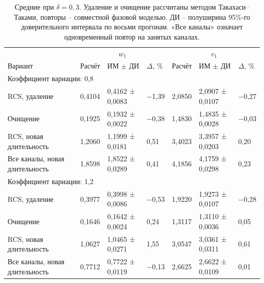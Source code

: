 
\begin{table}[!htbp]
\centering\small\setlength{\tabcolsep}{2pt}
\begin{tabular}{@{}p{4.16cm}p{1.61cm}p{2.83cm}p{1.28cm}p{1.61cm}p{2.83cm}p{1.28cm}@{}}
\toprule
 & \multicolumn{3}{c}{$w_1$} & \multicolumn{3}{c}{$v_1$} \\
Вариант & Расчёт & ИМ $\pm$ ДИ & $\Delta$, \% & Расчёт & ИМ $\pm$ ДИ & $\Delta$, \% \\
\midrule
\multicolumn{7}{l}{Коэффициент вариации: 0,8} \\
RCS, удаление & 0,4104 & 0,4162 ± 0,0083 & −1,39 & 2,0850 & 2,0907 ± 0,0107 & −0,27 \\
Очищение & 0,1925 & 0,1932 ± 0,0022 & −0,38 & 1,4830 & 1,4835 ± 0,0028 & −0,03 \\
RCS, новая длительность & 1,2060 & 1,1999 ± 0,0181 & 0,51 & 3,4023 & 3,3957 ± 0,0203 & 0,20 \\
Все каналы, новая длительность & 1,8598 & 1,8522 ± 0,0289 & 0,41 & 4,1856 & 4,1759 ± 0,0298 & 0,23 \\
\multicolumn{7}{l}{Коэффициент вариации: 1,2} \\
RCS, удаление & 0,3977 & 0,3998 ± 0,0086 & −0,53 & 1,9220 & 1,9273 ± 0,0107 & −0,28 \\
Очищение & 0,1646 & 0,1642 ± 0,0024 & 0,24 & 1,3117 & 1,3110 ± 0,0036 & 0,05 \\
RCS, новая длительность & 1,0627 & 1,0465 ± 0,0271 & 1,55 & 3,0547 & 3,0361 ± 0,0311 & 0,61 \\
Все каналы, новая длительность & 0,7712 & 0,7722 ± 0,0119 & −0,13 & 2,6625 & 2,6622 ± 0,0109 & 0,01 \\
\bottomrule
\end{tabular}
\caption{Средние при $\delta=0{,}3$. Удаление и очищение рассчитаны методом Такахаси--Таками, повторы -- совместной фазовой моделью. ДИ -- полуширина 95\%-го доверительного интервала по восьми прогонам. «Все каналы» означает одновременный повтор на занятых каналах.}
\label{tab:results}
\end{table}


